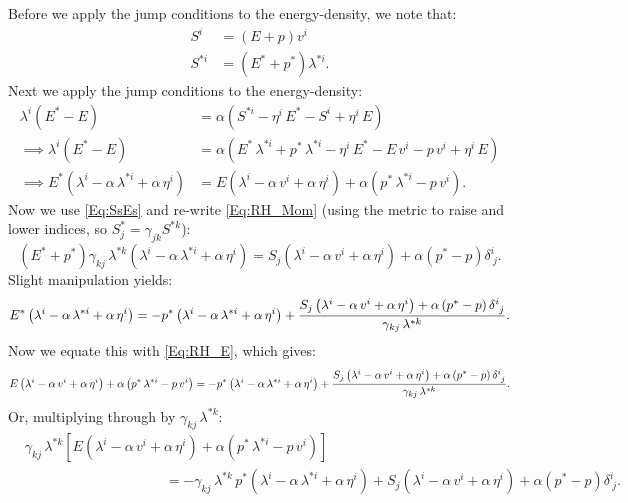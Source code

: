 \documentclass[10pt,preprint]{../aastex}
\begin{document}
Before we apply the jump conditions to the energy-density, we note that:
\begin{align}
    S^{i}&=\left(E+p\right)v^{i}\\
    S^{*i}&=\left(E^{*}+p^{*}\right)\lambda^{*i}.\label{Eq:SsEs}
\end{align}
Next we apply the jump conditions to the energy-density:
\begin{align}
    \lambda^{i}\left(E^{*}-E\right)&=\alpha\left(S^{*i}-\eta^{i}\,E^{*}-S^{i}+\eta^{i}\,E\right)\\
    \implies\lambda^{i}\left(E^{*}-E\right)&=\alpha\left(E^{*}\,\lambda^{*i}+p^{*}\,\lambda^{*i}-\eta^{i}\,E^{*}-E\,v^{i}-p\,v^{i}+\eta^{i}\,E\right)\\
    \implies E^{*}\left(\lambda^{i}-\alpha\,\lambda^{*i}+\alpha\,\eta^{i}\right)&=E\left(\lambda^{i}-\alpha\,v^{i}+\alpha\,\eta^{i}\right)+\alpha\left(p^{*}\,\lambda^{*i}-p\,v^{i}\right).\label{Eq:RH_E}
\end{align}
Now we use \eqref{Eq:SsEs} and re-write \eqref{Eq:RH_Mom} (using the metric to raise and lower indices, so $S^{*}_{j}=\gamma_{jk}S^{*k}$):
\begin{equation}
    \left(E^{*}+p^{*}\right)\gamma_{kj}\,\lambda^{*k}\left(\lambda^{i}-\alpha\,\lambda^{*i}+\alpha\,\eta^{i}\right)=S_{j}\left(\lambda^{i}-\alpha\,v^{i}+\alpha\,\eta^{i}\right)+\alpha\left(p^{*}-p\right)\delta^{i}_{~j}.
\end{equation}
Slight manipulation yields:
\begin{equation}
    E^{*}\left(\lambda^{i}-\alpha\,\lambda^{*i}+\alpha\,\eta^{i}\right)=-p^{*}\left(\lambda^{i}-\alpha\,\lambda^{*i}+\alpha\,\eta^{i}\right)+\frac{S_{j}\left(\lambda^{i}-\alpha\,v^{i}+\alpha\,\eta^{i}\right)+\alpha\left(p^{*}-p\right)\delta^{i}_{~j}}{\gamma_{kj}\,\lambda^{*k}}.
\end{equation}
Now we equate this with \eqref{Eq:RH_E}, which gives:
\begin{equation}
    E\left(\lambda^{i}-\alpha\,v^{i}+\alpha\,\eta^{i}\right)+\alpha\left(p^{*}\,\lambda^{*i}-p\,v^{i}\right)=-p^{*}\left(\lambda^{i}-\alpha\,\lambda^{*i}+\alpha\,\eta^{i}\right)+\frac{S_{j}\left(\lambda^{i}-\alpha\,v^{i}+\alpha\,\eta^{i}\right)+\alpha\left(p^{*}-p\right)\delta^{i}_{~j}}{\gamma_{kj}\,\lambda^{*k}}.
\end{equation}
Or, multiplying through by $\gamma_{kj}\,\lambda^{*k}$:    
\begin{align}
    &\gamma_{kj}\,\lambda^{*k}\left[E\left(\lambda^{i}-\alpha\,v^{i}+\alpha\,\eta^{i}\right)+\alpha\left(p^{*}\,\lambda^{*i}-p\,v^{i}\right)\right]\nonumber\\
    &\hspace{10em}=-\gamma_{kj}\,\lambda^{*k}\,p^{*}\left(\lambda^{i}-\alpha\,\lambda^{*i}+\alpha\,\eta^{i}\right)+S_{j}\left(\lambda^{i}-\alpha\,v^{i}+\alpha\,\eta^{i}\right)+\alpha\left(p^{*}-p\right)\delta^{i}_{~j}.
\end{align}
\end{document}
